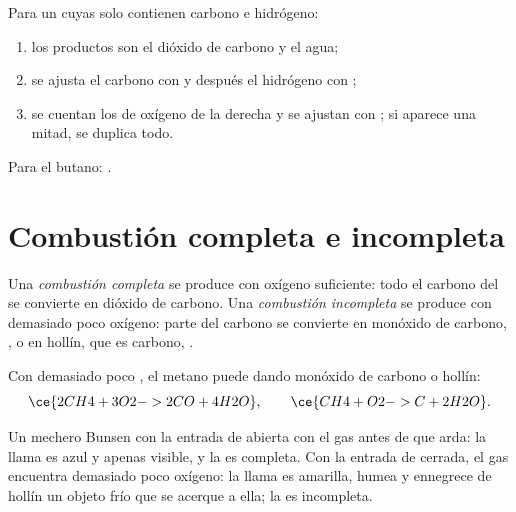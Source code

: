 \begin{method}\label{met:g8:combustion-and-fuels:write}
Para un  cuyas  solo contienen carbono e hidrógeno:
\begin{enumerate}
  \item los productos son el dióxido de carbono y el agua;
  \item se ajusta el carbono con  y después el hidrógeno con
        ;
  \item se cuentan los  de oxígeno de la derecha y se ajustan con
        ; si aparece una mitad, se duplica todo.
\end{enumerate}
Para el butano: .
\end{method}

\section{Combustión completa e incompleta}

\begin{definition}\label{def:g8:combustion-and-fuels:complete}
Una \emph{combustión completa} se produce
con oxígeno suficiente: todo el carbono del  se convierte en
dióxido de carbono. Una
\emph{combustión incompleta} se produce
con demasiado poco oxígeno: parte del carbono se convierte en monóxido
de carbono, , o en hollín, que es carbono, .
\end{definition}

\begin{example}\label{ex:g8:combustion-and-fuels:incomplete}
Con demasiado poco , el metano puede  dando monóxido de carbono
o hollín:
\[
  \ce{2CH4 + 3O2 -> 2CO + 4H2O}, \qquad \ce{CH4 + O2 -> C + 2H2O}.
\]
\end{example}

\begin{proposition}\label{prop:g8:combustion-and-fuels:flame}
Un mechero Bunsen con la entrada de  abierta   con el gas
antes de que arda: la llama es azul y apenas visible, y la  es
completa. Con la entrada de  cerrada, el gas encuentra demasiado
poco oxígeno: la llama es amarilla, humea y ennegrece de hollín un
objeto frío que se acerque a ella; la  es incompleta.
\end{proposition}

